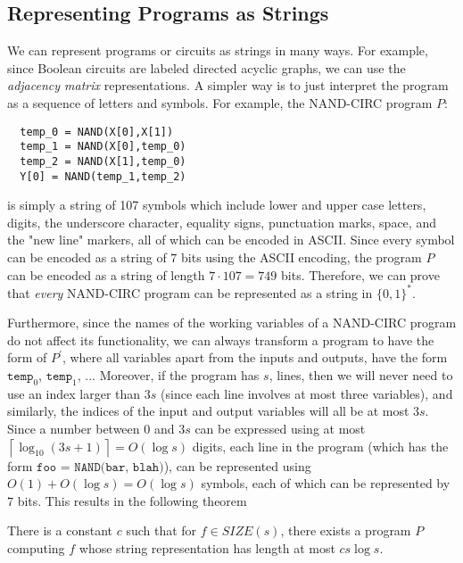 \subsection{Representing Programs as Strings}

  We can represent programs or circuits as strings in many ways. For example, since Boolean circuits are labeled directed acyclic graphs, we can use the \textit{adjacency matrix} representations. A simpler way is to just interpret the program as a sequence of letters and symbols. For example, the NAND-CIRC program $P$: 
  \begin{lstlisting}
  temp_0 = NAND(X[0],X[1])
  temp_1 = NAND(X[0],temp_0)
  temp_2 = NAND(X[1],temp_0)
  Y[0] = NAND(temp_1,temp_2)
  \end{lstlisting}
  is simply a string of 107 symbols which include lower and upper case letters, digits, the underscore character, equality signs, punctuation marks, space, and the "new line" markers, all of which can be encoded in ASCII. Since every symbol can be encoded as a string of $7$ bits using the ASCII encoding, the program $P$ can be encoded as a string of length $7 \cdot 107 = 749$ bits. Therefore, we can prove that \textit{every} NAND-CIRC program can be represented as a string in $\{0,1\}^*$. 

  Furthermore, since the names of the working variables of a NAND-CIRC program do not affect its functionality, we can always transform a program to have the form of $P^\prime$, where all variables apart from the inputs and outputs, have the form $\texttt{temp}_0$, $\texttt{temp}_1$, ... Moreover, if the program has $s$, lines, then we will never need to use an index larger than $3s$ (since each line involves at most three variables), and similarly, the indices of the input and output variables will all be at most $3s$. Since a number between $0$ and $3s$ can be expressed using at most $\left\lceil{\log_{10} (3s+1)} \right\rceil = O(\log s)$ digits, each line in the program (which has the form $\texttt{foo = NAND(bar, blah)}$), can be represented using $O(1) + O(\log s) = O(\log s)$ symbols, each of which can be represented by $7$ bits. This results in the following theorem 

  \begin{theorem}
  There is a constant $c$ such that for $f \in SIZE(s)$, there exists a program $P$ computing $f$ whose string representation has length at most $cs \log s$. 
  \end{theorem}

